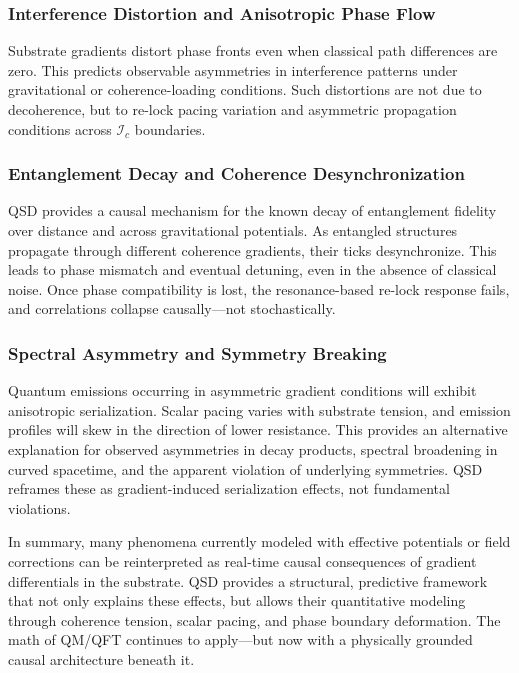 \documentclass[entropy,article,submit,pdftex,moreauthors]{Definitions/mdpi}
\begin{document}
\subsubsection{Interference Distortion and Anisotropic Phase Flow}

Substrate gradients distort phase fronts even when classical path differences are zero. This predicts observable asymmetries in interference patterns under gravitational or coherence-loading conditions. Such distortions are not due to decoherence, but to re-lock pacing variation and asymmetric propagation conditions across \( \mathcal{I}_c \) boundaries.

\subsubsection{Entanglement Decay and Coherence Desynchronization}

QSD provides a causal mechanism for the known decay of entanglement fidelity over distance and across gravitational potentials. As entangled structures propagate through different coherence gradients, their ticks desynchronize. This leads to phase mismatch and eventual detuning, even in the absence of classical noise. Once phase compatibility is lost, the resonance-based re-lock response fails, and correlations collapse causally—not stochastically.

\subsubsection{Spectral Asymmetry and Symmetry Breaking}

Quantum emissions occurring in asymmetric gradient conditions will exhibit anisotropic serialization. Scalar pacing varies with substrate tension, and emission profiles will skew in the direction of lower resistance. This provides an alternative explanation for observed asymmetries in decay products, spectral broadening in curved spacetime, and the apparent violation of underlying symmetries. QSD reframes these as gradient-induced serialization effects, not fundamental violations.

\smallskip

In summary, many phenomena currently modeled with effective potentials or field corrections can be reinterpreted as real-time causal consequences of gradient differentials in the substrate. QSD provides a structural, predictive framework that not only explains these effects, but allows their quantitative modeling through coherence tension, scalar pacing, and phase boundary deformation. The math of QM/QFT continues to apply—but now with a physically grounded causal architecture beneath it.
\end{document}
